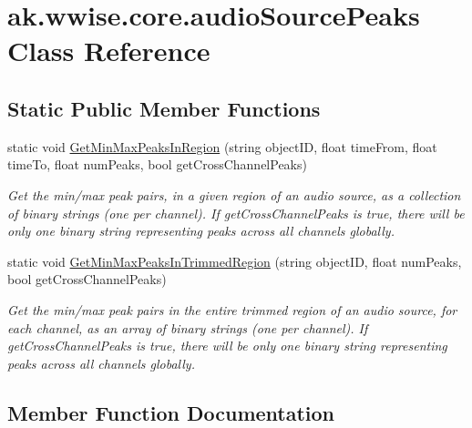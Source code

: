 \hypertarget{classak_1_1wwise_1_1core_1_1audio_source_peaks}{}\section{ak.\+wwise.\+core.\+audio\+Source\+Peaks Class Reference}
\label{classak_1_1wwise_1_1core_1_1audio_source_peaks}
\subsection*{Static Public Member Functions}
\begin{DoxyCompactItemize}
\item 
static void \mbox{\hyperlink{classak_1_1wwise_1_1core_1_1audio_source_peaks_a45c75a2d330071d850965611b84bba7b}{Get\+Min\+Max\+Peaks\+In\+Region}} (string object\+ID, float time\+From, float time\+To, float num\+Peaks, bool get\+Cross\+Channel\+Peaks)
\begin{DoxyCompactList}\small\item\em Get the min/max peak pairs, in a given region of an audio source, as a collection of binary strings (one per channel). If get\+Cross\+Channel\+Peaks is true, there will be only one binary string representing peaks across all channels globally. \end{DoxyCompactList}\item 
static void \mbox{\hyperlink{classak_1_1wwise_1_1core_1_1audio_source_peaks_a6e82a3efd62537cae654061123a94c57}{Get\+Min\+Max\+Peaks\+In\+Trimmed\+Region}} (string object\+ID, float num\+Peaks, bool get\+Cross\+Channel\+Peaks)
\begin{DoxyCompactList}\small\item\em Get the min/max peak pairs in the entire trimmed region of an audio source, for each channel, as an array of binary strings (one per channel). If get\+Cross\+Channel\+Peaks is true, there will be only one binary string representing peaks across all channels globally. \end{DoxyCompactList}\end{DoxyCompactItemize}


\subsection{Member Function Documentation}
\mbox{\label{classak_1_1wwise_1_1core_1_1audio_source_peaks_a45c75a2d330071d850965611b84bba7b}} 
